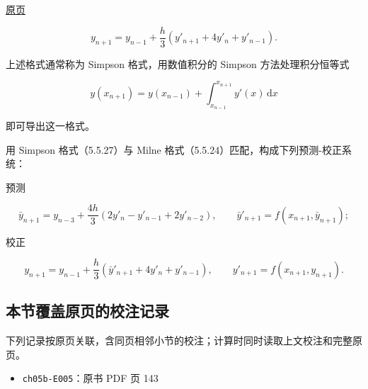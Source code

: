 \documentclass[
  10pt,
  fontset=fandol]{ctexart}
\providecommand{\tightlist}{%
  \setlength{\itemsep}{0pt}\setlength{\parskip}{0pt}}
\begin{document}
\href{../../source-images/pdf-144.jpeg}{原页}

\[
y_{n+1}=y_{n-1}+\frac h3(y'_{n+1}+4y'_n+y'_{n-1}).
\tag{5.5.27}
\]

上述格式通常称为 Simpson 格式，用数值积分的 Simpson 方法处理积分恒等式

\[
y(x_{n+1})=y(x_{n-1})+\int_{x_{n-1}}^{x_{n+1}}y'(x)\,\mathrm dx
\]

即可导出这一格式。

用 Simpson 格式（5.5.27）与 Milne 格式（5.5.24）匹配，构成下列预测-校正系统：

预测

\[
\bar y_{n+1}=y_{n-3}+\frac{4h}{3}(2y'_n-y'_{n-1}+2y'_{n-2}),\qquad
\bar y'_{n+1}=f(x_{n+1},\bar y_{n+1});
\]

校正

\[
y_{n+1}=y_{n-1}+\frac h3(\bar y'_{n+1}+4y'_n+y'_{n-1}),\qquad
y'_{n+1}=f(x_{n+1},y_{n+1}).
\]

\subsection{本节覆盖原页的校注记录}\label{ux672cux8282ux8986ux76d6ux539fux9875ux7684ux6821ux6ce8ux8bb0ux5f55}

下列记录按原页关联，含同页相邻小节的校注；计算时同时读取上文校注和完整原页。

\begin{itemize}
\tightlist
\item
  \texttt{ch05b-E005}：原书 PDF 页 143
\end{itemize}
\end{document}
